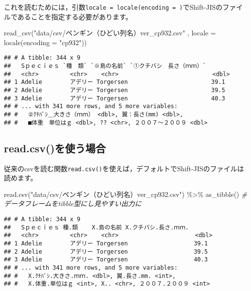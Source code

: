 \documentclass[
  xelatex,ja=standard, b5paper]{bxjsbook}
\newenvironment{Shaded}{\begin{snugshade}}{\end{snugshade}}
\newcommand{\AttributeTok}[1]{\textcolor[rgb]{0.77,0.63,0.00}{#1}}
\newcommand{\CommentTok}[1]{\textcolor[rgb]{0.56,0.35,0.01}{\textit{#1}}}
\newcommand{\FunctionTok}[1]{\textcolor[rgb]{0.00,0.00,0.00}{#1}}
\newcommand{\NormalTok}[1]{#1}
\newcommand{\SpecialCharTok}[1]{\textcolor[rgb]{0.00,0.00,0.00}{#1}}
\newcommand{\StringTok}[1]{\textcolor[rgb]{0.31,0.60,0.02}{#1}}
\begin{document}
これを読むためには，引数\texttt{locale\ =\ locale(encoding\ =\ )}でShift-JISのファイルであることを指定する必要があります。

\begin{Shaded}
\begin{Highlighting}[]
\FunctionTok{read\_csv}\NormalTok{(}\StringTok{"data/csv/ペンギン（ひどい列名）ver\_cp932.csv"}
\NormalTok{         , }\AttributeTok{locale =} \FunctionTok{locale}\NormalTok{(}\AttributeTok{encoding =} \StringTok{"cp932"}\NormalTok{))}
\end{Highlighting}
\end{Shaded}

\begin{verbatim}
## # A tibble: 344 x 9
##   Sｐｅｃｉｅｓ `種　類` `※島の名前` `①クチバシ　長さ（ｍｍ）`
##   <chr>         <chr>    <chr>                           <dbl>
## 1 Adelie        アデリー Torgersen                        39.1
## 2 Adelie        アデリー Torgersen                        39.5
## 3 Adelie        アデリー Torgersen                        40.3
## # ... with 341 more rows, and 5 more variables:
## #   ②ｸﾁﾊﾞｼ＿大きさ（ｍｍ） <dbl>, 翼：長さ(mm) <dbl>,
## #   ■体重　単位はｇ <dbl>, ?? <chr>, ２００７～２００９ <dbl>
\end{verbatim}

\newpage

\hypertarget{read.csvux3092ux4f7fux3046ux5834ux5408}{%
\subsection{read.csv()を使う場合}\label{read.csvux3092ux4f7fux3046ux5834ux5408}}

従来のcsvを読む関数\texttt{read.csv()}を使えば，デフォルトでShift-JISのファイルは読めます。

\begin{Shaded}
\begin{Highlighting}[]
\FunctionTok{read.csv}\NormalTok{(}\StringTok{"data/csv/ペンギン（ひどい列名）ver\_cp932.csv"}\NormalTok{) }\SpecialCharTok{\%\textgreater{}\%}
    \FunctionTok{as\_tibble}\NormalTok{()  }\CommentTok{\# データフレームをtibble型にし見やすい出力に}
\end{Highlighting}
\end{Shaded}

\begin{verbatim}
## # A tibble: 344 x 9
##   Sｐｅｃｉｅｓ 種.類    X.島の名前 X.クチバシ.長さ.ｍｍ.
##   <chr>         <chr>    <chr>                      <dbl>
## 1 Adelie        アデリー Torgersen                   39.1
## 2 Adelie        アデリー Torgersen                   39.5
## 3 Adelie        アデリー Torgersen                   40.3
## # ... with 341 more rows, and 5 more variables:
## #   X.ｸﾁﾊﾞｼ.大きさ.ｍｍ. <dbl>, 翼.長さ.mm. <int>,
## #   X.体重.単位はｇ <int>, X.. <chr>, ２００７.２００９ <int>
\end{verbatim}
\end{document}
